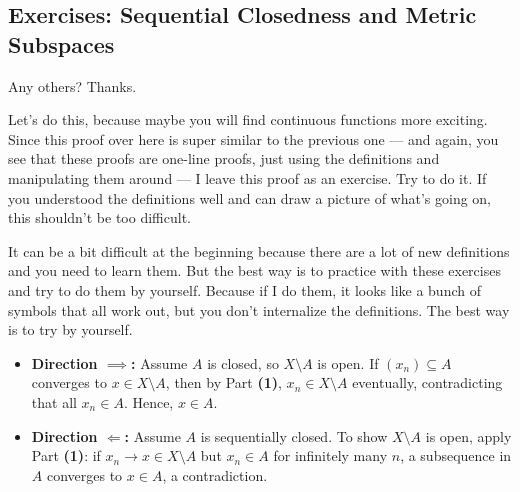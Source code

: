 \subsection{Exercises: Sequential Closedness and Metric Subspaces}

\begin{speech}[00:54:06 - 00:55:23]
Any others? Thanks. 

Let's do this, because maybe you will find continuous functions more exciting. Since this proof over here is super similar to the previous one --- and again, you see that these proofs are one-line proofs, just using the definitions and manipulating them around --- I leave this proof as an exercise. Try to do it. If you understood the definitions well and can draw a picture of what's going on, this shouldn't be too difficult.

It can be a bit difficult at the beginning because there are a lot of new definitions and you need to learn them. But the best way is to practice with these exercises and try to do them by yourself. Because if I do them, it looks like a bunch of symbols that all work out, but you don't internalize the definitions. The best way is to try by yourself.
\end{speech}

\begin{content}

\begin{steps}
\begin{itemize}
    \item \textbf{Direction $\implies$:} Assume $A$ is closed, so $X \setminus A$ is open. If $(x_n) \subseteq A$ converges to $x \in X \setminus A$, then by Part \textbf{(1)}, $x_n \in X \setminus A$ eventually, contradicting that all $x_n \in A$. Hence, $x \in A$.
    \item \textbf{Direction $\Leftarrow$:} Assume $A$ is sequentially closed. To show $X \setminus A$ is open, apply Part \textbf{(1)}: if $x_n \to x \in X \setminus A$ but $x_n \in A$ for infinitely many $n$, a subsequence in $A$ converges to $x \in A$, a contradiction.
\end{itemize}
\end{steps}
\end{content}


